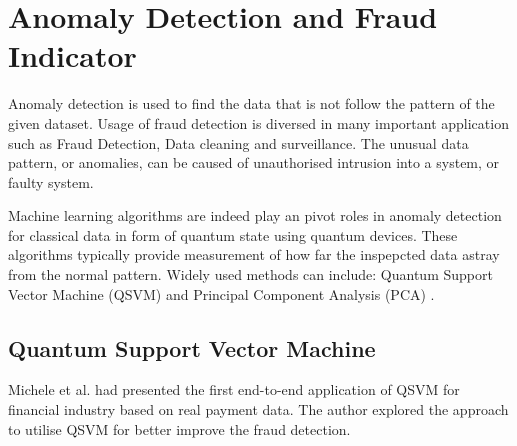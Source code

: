 \section{Anomaly Detection and Fraud Indicator} \label{Sec: Anomaly Detection and Fraud Indicator}

Anomaly detection is used to find the data that is not follow the pattern of the given dataset.
Usage of fraud detection is diversed in many important application such as Fraud Detection, Data cleaning and surveillance.
The unusual data pattern, or anomalies, can be caused of unauthorised intrusion into a system, or faulty system.

Machine learning algorithms are indeed play an pivot roles in anomaly detection for classical data in form of quantum state using quantum devices.
These algorithms typically provide measurement of how far the inspepcted data astray from the normal pattern.
Widely used methods can include: Quantum Support Vector Machine (QSVM) \cite{grossiMixedQuantumClassical2022} and Principal Component Analysis (PCA) \cite{lloydQuantumPrincipalComponent2014, liuQuantumMachineLearning2018}.

\subsection{Quantum Support Vector Machine}
Michele et al. \cite{grossiMixedQuantumClassical2022} had presented the first end-to-end application of QSVM for financial industry based on real payment data.
The author explored the approach to utilise QSVM for better improve the fraud detection.
